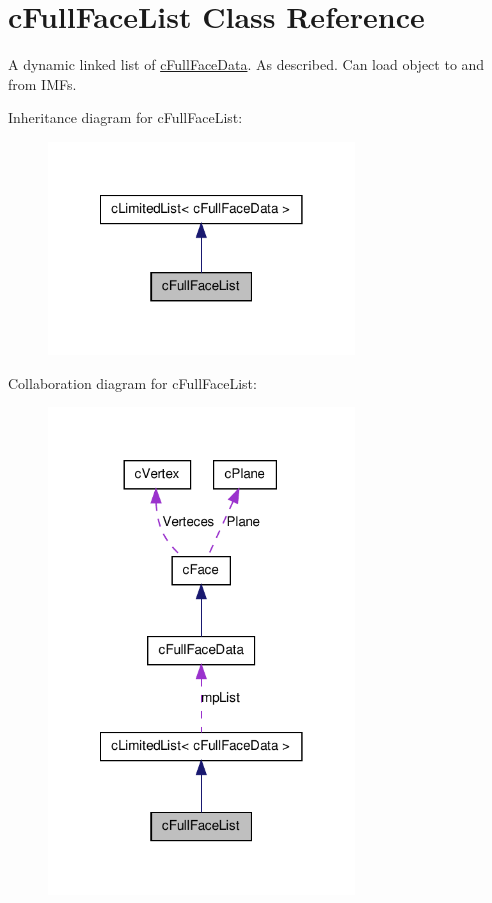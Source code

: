 \hypertarget{classc_full_face_list}{
\section{cFullFaceList Class Reference}
\label{classc_full_face_list}
}


A dynamic linked list of \hyperlink{classc_full_face_data}{cFullFaceData}. As described. Can load object to and from IMFs.  




Inheritance diagram for cFullFaceList:
\nopagebreak
\begin{figure}[H]
\begin{center}
\leavevmode
\includegraphics[width=230pt]{classc_full_face_list__inherit__graph}
\end{center}
\end{figure}


Collaboration diagram for cFullFaceList:
\nopagebreak
\begin{figure}[H]
\begin{center}
\leavevmode
\includegraphics[width=230pt]{classc_full_face_list__coll__graph}
\end{center}
\end{figure}
